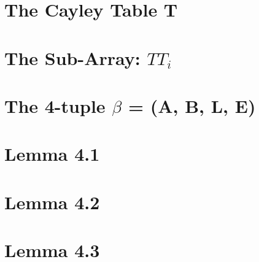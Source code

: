 \section{The Cayley Table T}

\section{The Sub-Array: $TT_i$}


\section{The 4-tuple $\beta$ = (A, B, L, E)}


\section{Lemma 4.1}


\section{Lemma 4.2}


\section{Lemma 4.3}








